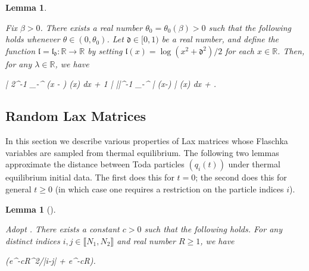 \documentclass{amsart}
\numberwithin{equation}{section}
\newtheorem{lem}[thm]{Lemma}
\theoremstyle{remark}
\theoremstyle{definition}
\begin{document}
	\begin{lem}
		
		\label{beta0theta}
		
		Fix $\beta > 0$. There exists a real number $\theta_0 = \theta_0 (\beta) > 0$ such that the following holds whenever $\theta \in (0, \theta_0)$. Let $\mathfrak{d} \in [0,1)$ be a real number, and define the function $\mathfrak{l} = \mathfrak{l}_{\mathfrak{d}}: \mathbb{R} \rightarrow \mathbb{R}$ by setting $\mathfrak{l}(x) = \log (x^2+\mathfrak{d}^2)/2$ for each $x \in \mathbb{R}$. Then, for any $\lambda \in \mathbb{R}$, we have 
		\begin{flalign*}
			\Bigg| 2\alpha^{-1} \displaystyle\int_{-\infty}^{\infty}  (x - \lambda)  \varrho (x) dx + 1 \Bigg|  |\alpha|^{-1} \displaystyle\int_{-\infty}^{\infty} | (x-\lambda) |  \varrho (x) dx + \displaystyle{}. 
		\end{flalign*}
		
	\end{lem} 
	
	

	\subsection{Random Lax Matrices} 
	
	\label{Localization}
	
	In this section we describe various properties of Lax matrices whose Flaschka variables are sampled from thermal equilibrium. The following two lemmas approximate the distance between Toda particles $(q_i (t))$ under thermal equilibrium initial data. The first does this for $t=0$; the second does this for general $t \ge 0$ (in which case one requires a restriction on the particle indices $i$).
	
	\begin{lem}[{\cite[Lemma 3.12]{LC}}]
		\label{qij} 
		
		Adopt . There exists a constant $c > 0$ such that the following holds. For any distinct indices $i, j \in \llbracket N_1, N_2 \rrbracket$ and real number $R \ge 1$, we have 
		\begin{flalign*}
			   (e^{-cR^2/|i-j|} + e^{-cR}).
		\end{flalign*}
	\end{lem} 
	
\end{document}
